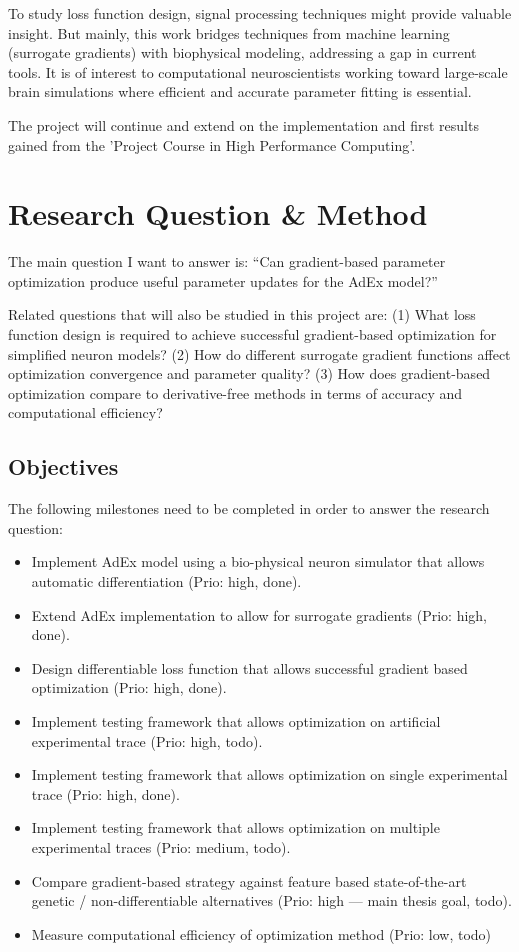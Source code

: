 \documentclass{article}
\begin{document}
To study loss function design, signal processing techniques might provide valuable insight.
But mainly, this work bridges techniques from machine learning (surrogate gradients) with biophysical modeling, addressing a gap in current tools.
It is of interest to computational neuroscientists working toward large-scale brain simulations where efficient and accurate parameter fitting is essential.

The project will continue and extend on the implementation and first results gained from the 'Project Course in High Performance Computing'.

\section{Research Question \& Method}

The main question I want to answer is: ``Can gradient-based parameter optimization produce useful parameter updates for the AdEx model?''

Related questions that will also be studied in this project are:
(1) What loss function design is required to achieve successful gradient-based optimization for simplified neuron models?
(2) How do different surrogate gradient functions affect optimization convergence and parameter quality?
(3) How does gradient-based optimization compare to derivative-free methods in terms of accuracy and computational efficiency?

\subsection{Objectives}

The following milestones need to be completed in order to answer the research question:

\begin{itemize}
    \item Implement AdEx model using a bio-physical neuron simulator that allows automatic differentiation (Prio: high, done).
    \item Extend AdEx implementation to allow for surrogate gradients (Prio: high, done).
    \item Design differentiable loss function that allows successful gradient based optimization (Prio: high, done).
    \item Implement testing framework that allows optimization on artificial experimental trace (Prio: high, todo).
    \item Implement testing framework that allows optimization on single experimental trace (Prio: high, done).
    \item Implement testing framework that allows optimization on multiple experimental traces (Prio: medium, todo).
    \item Compare gradient-based strategy against feature based state-of-the-art genetic / non-differentiable alternatives (Prio: high --- main thesis goal, todo).
    \item Measure computational efficiency of optimization method (Prio: low, todo)
\end{itemize}
\end{document}
